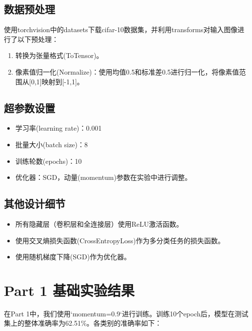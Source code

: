 \documentclass[12pt,a4paper,UTF8]{ctexart}
\begin{document}
\subsection{数据预处理}

使用torchvision中的datasets下载cifar-10数据集，并利用transforms对输入图像进行了以下预处理：
\begin{enumerate}
    \item 转换为张量格式(ToTensor)。
    \item 像素值归一化(Normalize)：使用均值0.5和标准差0.5进行归一化，将像素值范围从[0,1]映射到[-1,1]。
\end{enumerate}

\subsection{超参数设置}
\begin{itemize}
    \item 学习率(learning rate)：0.001
    \item 批量大小(batch size)：8
    \item 训练轮数(epochs)：10
    \item 优化器：SGD，动量(momentum)参数在实验中进行调整。
\end{itemize}

\subsection{其他设计细节}
\begin{itemize}
    \item 所有隐藏层（卷积层和全连接层）使用ReLU激活函数。
    \item 使用交叉熵损失函数(CrossEntropyLoss)作为多分类任务的损失函数。
    \item 使用随机梯度下降(SGD)作为优化器。
\end{itemize}

\section{\textbf{Part 1} 基础实验结果}

在Part 1中，我们使用`momentum=0.9`进行训练。训练10个epoch后，模型在测试集上的整体准确率为62.51\%。各类别的准确率如下：
\end{document}
